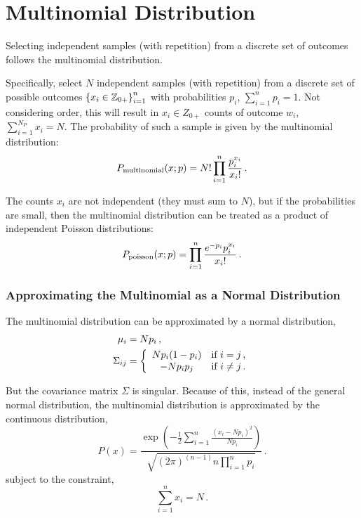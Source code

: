 \chapter{Multinomial Distribution}
Selecting independent samples (with repetition) from a discrete set of outcomes follows the multinomial distribution.

Specifically, select $N$ independent samples (with repetition) from a discrete set of possible outcomes $\left\{x_i \in \mathbb{Z}_{0+}\right\}_{i=1}^{n}$ with probabilities $p_i$,  $\sum_{i=1}^{n} p_i = 1$.  Not considering order, this will result in $x_i \in Z_{0+}$ counts of outcome $w_i$, $\sum_{i=1}^{N_P} x_i = N$.
The probability of such a sample is given by the multinomial distribution:
\begin{equation}
\index{multinomial ! probability}
\label{eq:multinomial}
P_{\text{multinomial}}(x;p)={N!}\prod_{i=1}^{n} \frac{p_i^{x_i}}{x_i!} \,. 
\end{equation}

The counts $x_i$ are not independent (they must sum to $N$), but if the probabilities are small, then the multinomial distribution can be treated as a product of independent Poisson distributions:
\begin{equation}
\index{poisson ! probability}
P_{\text{poisson}}(x;p) = \prod_{i=1}^{n} \frac{e^{-p_i} p_i^{x_i}}{x_i!} \,.
\end{equation}

\subsection{Approximating the Multinomial as a Normal Distribution}
The multinomial distribution can be approximated by a normal distribution,
\begin{align}
\index{multinomial ! mean $\mu$}
\mu_i&=N p_i \,, \\
\index{multinomial ! covariance $\Sigma$}
\Sigma_{ij} &= \left\{ \begin{array}{cl} N p_i (1-p_i)& \text{if $i=j$}\,, \\
                                      -N p_i p_j & \text{if $i \neq j$}\,.
  \end{array} \right.
\end{align}

But the covariance matrix $\Sigma$ is singular.  Because of this, instead of the general normal distribution, the multinomial distribution is approximated by the continuous distribution,
\begin{equation}
P(x)=\frac{\exp\left(-\frac{1}{2} \sum_{i=1}^{n} \frac{(x_i-Np_i)^2}{Np_i} \right)}{\sqrt{(2\pi)^{(n-1)} n \prod_{i=1}^{n} p_i}}   \,.
\end{equation}
subject to the constraint,
\begin{equation}
\sum_{i=1}^{n} x_i = N \,.
\end{equation}

